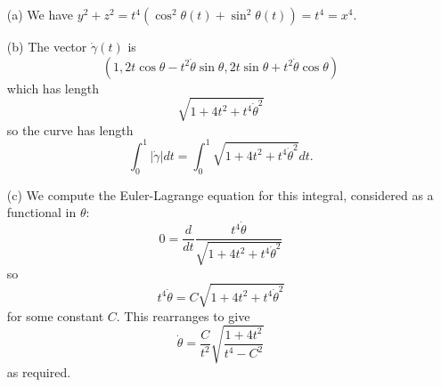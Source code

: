 \documentclass[12pt]{article}
\begin{document}
\begin{answer}
\begin{enumerate}
\item[(a)] We have $y^2+z^2=t^4(\cos^2\theta(t)+\sin^2\theta(t))=t^4=x^4$.
\item[(b)] The vector $\dot{\gamma}(t)$ is
\[(1,2t\cos\theta-t^2\dot{\theta}\sin\theta,2t\sin\theta+t^2\dot{\theta}\cos\theta)\]
which has length
\[\sqrt{1+4t^2+t^4\dot{\theta}^2}\]
so the curve has length
\[\int_0^1|\dot{\gamma}|dt=\int_0^1\sqrt{1+4t^2+t^4\dot{\theta}^2}dt.\]
\item[(c)] We compute the Euler-Lagrange equation for this integral, considered as a functional in $\theta$:
\[0=\frac{d}{dt}\frac{t^4\dot{\theta}}{\sqrt{1+4t^2+t^4\dot{\theta}^2}}\]
so
\[t^4\dot{\theta}=C\sqrt{1+4t^2+t^4\dot{\theta}^2}\]
for some constant $C$. This rearranges to give
\[\dot{\theta}=\frac{C}{t^2}\sqrt{\frac{1+4t^2}{t^4-C^2}}\]
as required.
\end{enumerate}
\end{answer}
\end{document}
